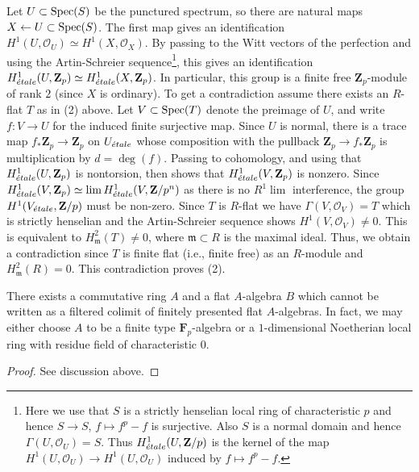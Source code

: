 \medskip\noindent
Let $U \subset \mathop{\mathrm{Spec}}(S)$ be the punctured spectrum, so there are natural
maps $X \leftarrow U \subset \mathop{\mathrm{Spec}}(S)$. The first map gives an
identification $H^1(U, \mathcal{O}_U) \simeq H^1(X, \mathcal{O}_X)$.
By passing to the Witt vectors of the perfection and using the
Artin-Schreier sequence\footnote{Here we use that $S$ is a strictly
henselian local ring of characteristic $p$ and hence
$S \to S$, $f \mapsto f^p - f$ is surjective.
Also $S$ is a normal domain and hence
$\Gamma(U, \mathcal{O}_U) = S$. Thus $H^1_{\acute{e}tale}(U, \mathbf{Z}/p)$
is the kernel of the map $H^1(U, \mathcal{O}_U) \to H^1(U, \mathcal{O}_U)$
induced by $f \mapsto f^p - f$.}, this gives an identification
$H^1_{\acute{e}tale}(U, \mathbf{Z}_p) \simeq H^1_{\acute{e}tale}(X, \mathbf{Z}_p)$.
In particular, this group is a finite free $\mathbf{Z}_p$-module of
rank $2$ (since $X$ is ordinary). To get a contradiction assume
there exists an
$R$-flat $T$ as in (2) above. Let $V \subset \mathop{\mathrm{Spec}}(T)$ denote the preimage
of $U$, and write $f : V \to U$ for the induced finite surjective map.
Since $U$ is normal, there is a trace map $f_*\mathbf{Z}_p \to \mathbf{Z}_p$
on $U_{\acute{e}tale}$ whose composition with the pullback
$\mathbf{Z}_p \to f_*\mathbf{Z}_p$ is multiplication by $d = \deg(f)$.
Passing to cohomology, and using that $H^1_{\acute{e}tale}(U, \mathbf{Z}_p)$
is nontorsion, then shows that $H^1_{\acute{e}tale}(V, \mathbf{Z}_p)$ is nonzero.
Since $H^1_{\acute{e}tale}(V, \mathbf{Z}_p) \simeq \mathop{\mathrm{lim}}\nolimits H^1_{\acute{e}tale}(V, \mathbf{Z}/p^n)$
as there is no $R^1\lim$ interference, the group
$H^1(V_{\acute{e}tale},\mathbf{Z}/p)$ must be non-zero. Since $T$ is $R$-flat we
have $\Gamma(V, \mathcal{O}_V) = T$ which is strictly henselian and the
Artin-Schreier sequence shows $H^1(V, \mathcal{O}_V) \neq 0$.
This is equivalent to $H^2_\mathfrak m(T) \neq 0$, where
$\mathfrak m \subset R$ is the maximal ideal. Thus, we obtain
a contradiction since $T$ is finite flat (i.e., finite free) as an
$R$-module and $H^2_\mathfrak m(R) = 0$. This contradiction proves (2).

\begin{lemma}
\label{lemma-weird-flat-map}
There exists a commutative ring $A$ and a flat $A$-algebra $B$
which cannot be written as a filtered colimit of finitely
presented flat $A$-algebras. In fact, we may either choose $A$ to
be a finite type $\mathbf{F}_p$-algebra or a $1$-dimensional
Noetherian local ring with residue field of characteristic $0$.
\end{lemma}

\begin{proof}
See discussion above.
\end{proof}





